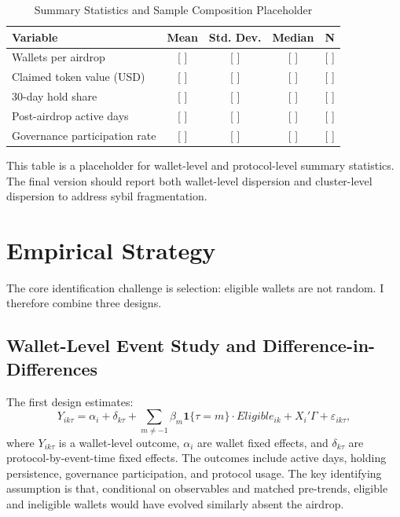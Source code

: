 \documentclass[11pt]{article}
\theoremstyle{remark}
\begin{document}
\begin{table}[H]
\centering
\begin{threeparttable}
\caption{Summary Statistics and Sample Composition Placeholder}
\label{tab:summary}
\begin{tabular}{lcccc}
\toprule
Variable & Mean & Std. Dev. & Median & N \\
\midrule
Wallets per airdrop & [ ] & [ ] & [ ] & [ ] \\
Claimed token value (USD) & [ ] & [ ] & [ ] & [ ] \\
30-day hold share & [ ] & [ ] & [ ] & [ ] \\
Post-airdrop active days & [ ] & [ ] & [ ] & [ ] \\
Governance participation rate & [ ] & [ ] & [ ] & [ ] \\
\bottomrule
\end{tabular}
\begin{tablenotes}
\footnotesize
\item This table is a placeholder for wallet-level and protocol-level summary statistics. The final version should report both wallet-level dispersion and cluster-level dispersion to address sybil fragmentation.
\end{tablenotes}
\end{threeparttable}
\end{table}

\section{Empirical Strategy}

The core identification challenge is selection: eligible wallets are not random. I therefore combine three designs.

\subsection{Wallet-Level Event Study and Difference-in-Differences}

The first design estimates:
\begin{equation}
Y_{ik\tau} = \alpha_i + \delta_{k\tau}
+ \sum_{m \neq -1}\beta_m \mathbf{1}\{\tau=m\} \cdot Eligible_{ik}
+ X_i' \Gamma + \varepsilon_{ik\tau},
\label{eq:did}
\end{equation}
where $Y_{ik\tau}$ is a wallet-level outcome, $\alpha_i$ are wallet fixed effects, and $\delta_{k\tau}$ are protocol-by-event-time fixed effects. The outcomes include active days, holding persistence, governance participation, and protocol usage. The key identifying assumption is that, conditional on observables and matched pre-trends, eligible and ineligible wallets would have evolved similarly absent the airdrop.
\end{document}
